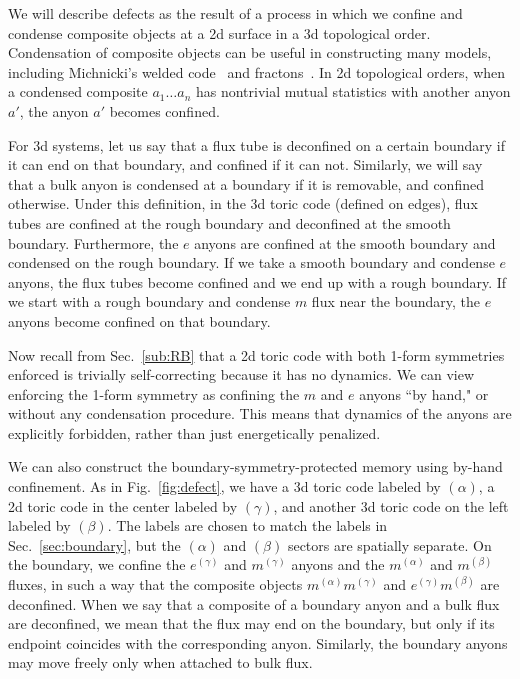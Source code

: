 We will describe defects as the result of a process in which we confine and condense composite objects at a 2d surface in a 3d topological order. Condensation of composite objects can be useful in constructing many models, including Michnicki's welded code~\cite{Michnicki2014PowerLaw, Siva2017Marginally} and fractons~\cite{Ma2017Coupled, Vijay2017Layer, Qi2021Exotic}. In 2d topological orders, when a condensed composite $a_1\dots a_n$ has nontrivial mutual statistics with another anyon $a'$, the anyon $a'$ becomes confined.

For 3d systems, let us say that a flux tube is deconfined on a certain boundary if it can end on that boundary, and confined if it can not. Similarly, we will say that a bulk anyon is condensed at a boundary if it is removable, and confined otherwise.
Under this definition, in the 3d toric code (defined on edges), flux tubes are confined at the rough boundary and deconfined at the smooth boundary. Furthermore, the $e$ anyons are confined at the smooth boundary and condensed on the rough boundary. If we take a smooth boundary and condense $e$ anyons, the flux tubes become confined and we end up with a rough boundary. If we start with a rough boundary and condense $m$ flux near the boundary, the $e$ anyons become confined on that boundary. 

Now recall from Sec.~\ref{sub:RB} that a 2d toric code with both 1-form symmetries enforced is trivially self-correcting because it has no dynamics. We can view enforcing the 1-form symmetry as confining the $m$ and $e$ anyons ``by hand," or without any condensation procedure. This means that dynamics of the anyons are explicitly forbidden, rather than just energetically penalized.

We can also construct the boundary-symmetry-protected memory using by-hand confinement. As in Fig.~\ref{fig:defect}, we have a 3d toric code labeled by $(\alpha)$, a 2d toric code in the center labeled by $(\gamma)$, and another 3d toric code on the left labeled by $(\beta)$. The labels are chosen to match the labels in Sec.~\ref{sec:boundary}, but the $(\alpha)$ and $(\beta)$ sectors are spatially separate. On the boundary, we confine the $e^{(\gamma)}$ and $m^{(\gamma)}$ anyons and the $m^{(\alpha)}$ and $m^{(\beta)}$ fluxes, in such a way that the composite objects $m^{(\alpha)}m^{(\gamma)}$ and $e^{(\gamma)}m^{(\beta)}$ are deconfined. When we say that a composite of a boundary anyon and a bulk flux are deconfined, we mean that the flux may end on the boundary, but only if its endpoint coincides with the corresponding anyon.  Similarly, the boundary anyons may move freely only when attached to bulk flux.

